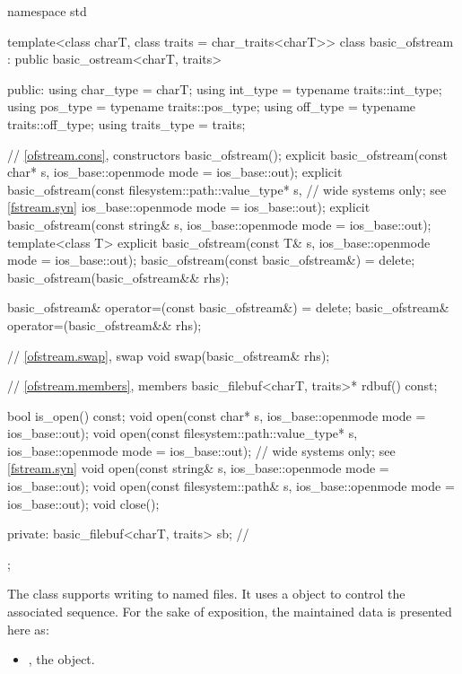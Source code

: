 %
\begin{codeblock}
namespace std {
  template<class charT, class traits = char_traits<charT>>
  class basic_ofstream : public basic_ostream<charT, traits> {
  public:
    using char_type   = charT;
    using int_type    = typename traits::int_type;
    using pos_type    = typename traits::pos_type;
    using off_type    = typename traits::off_type;
    using traits_type = traits;

    // \ref{ofstream.cons}, constructors
    basic_ofstream();
    explicit basic_ofstream(const char* s,
                            ios_base::openmode mode = ios_base::out);
    explicit basic_ofstream(const filesystem::path::value_type* s,  // wide systems only; see \ref{fstream.syn}
                            ios_base::openmode mode = ios_base::out);
    explicit basic_ofstream(const string& s,
                            ios_base::openmode mode = ios_base::out);
    template<class T>
      explicit basic_ofstream(const T& s, ios_base::openmode mode = ios_base::out);
    basic_ofstream(const basic_ofstream&) = delete;
    basic_ofstream(basic_ofstream&& rhs);

    basic_ofstream& operator=(const basic_ofstream&) = delete;
    basic_ofstream& operator=(basic_ofstream&& rhs);

    // \ref{ofstream.swap}, swap
    void swap(basic_ofstream& rhs);

    // \ref{ofstream.members}, members
    basic_filebuf<charT, traits>* rdbuf() const;

    bool is_open() const;
    void open(const char* s, ios_base::openmode mode = ios_base::out);
    void open(const filesystem::path::value_type* s,
              ios_base::openmode mode = ios_base::out);     // wide systems only; see \ref{fstream.syn}
    void open(const string& s, ios_base::openmode mode = ios_base::out);
    void open(const filesystem::path& s, ios_base::openmode mode = ios_base::out);
    void close();

  private:
    basic_filebuf<charT, traits> sb;    // \expos
  };
}
\end{codeblock}

\pnum
The class
supports writing to named files.
It uses a
object to control the associated
sequence.
For the sake of exposition, the maintained data is presented here as:
\begin{itemize}
\item
{}, the  object.
\end{itemize}

